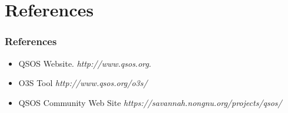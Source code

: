 \documentclass{beamer}
\begin{document}

\section{References}

\begin{frame}
 \frametitle{References}
 \begin{itemize}
  \item QSOS Website. \textit{http://www.qsos.org}.
  \item O3S Tool \textit{http://www.qsos.org/o3s/}
  \item QSOS Community Web Site \textit{https://savannah.nongnu.org/projects/qsos/}
  \end{itemize}

\end{frame}

\end{document}
